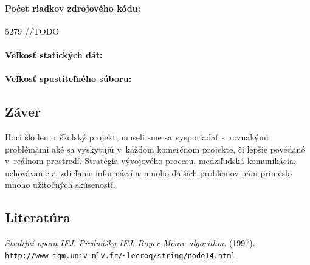 \documentclass[12pt,a4paper,titlepage,final]{article}
\begin{document}
\paragraph{Počet riadkov zdrojového kódu:} 5279 //TODO
\paragraph{Veľkosť statických dát:} 
\paragraph{Veľkosť spustiteľného súboru:}

\subsection{Záver}
Hoci šlo len o školský projekt, museli sme sa vysporiadať s rovnakými problémami aké sa vyskytujú v každom komerčnom projekte, či lepšie povedané v reálnom prostredí. Stratégia vývojového procesu, medziľudská komunikácia, uchovávanie a zdieľanie informácií a mnoho ďalších problémov nám prinieslo mnoho užitočných skúseností. 

\subsection{Literatúra}
\begin{thebibliography}{Per00}
    \emph{Studijní opora IFJ}.
    \emph{Přednášky IFJ}.
    \emph{Boyer-Moore algorithm}. (1997).\\
    \verb|http://www-igm.univ-mlv.fr/~lecroq/string/node14.html|
\end{thebibliography}
\end{document}
